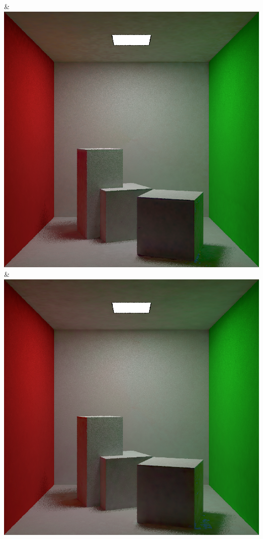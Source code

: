 & \includegraphics[width=\linewidth]{figures/py/tests/path_termination/1stvert_1spp.png}
& \includegraphics[width=\linewidth]{figures/py/tests/path_termination/1stdiff_1spp.png}
